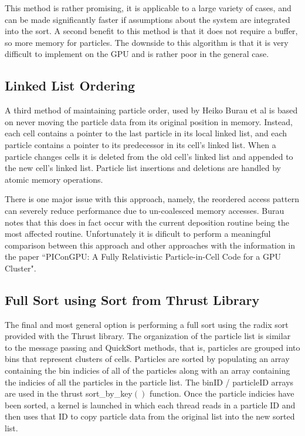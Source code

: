 This method is rather promising, it is applicable to a large variety of cases, and can be made significantly faster if assumptions about the system are integrated into the sort. A second benefit to this method is that it does not require a buffer, so more memory for particles. The downside to this algorithm is that it is very difficult to implement on the GPU and is rather poor in the general case. 


	\subsection{Linked List Ordering}
	A third method of maintaining particle order, used by Heiko Burau et al is based on never moving the particle data from its original position in memory. Instead, each cell contains a pointer to the last particle in its local linked list, and each particle contains a pointer to its predecessor in its cell's linked list. When a particle changes cells it is deleted from the old cell's linked list and appended to the new cell's linked list. Particle list insertions and deletions are handled by atomic memory operations. \cite{Burau2010}

	There is one major issue with this approach, namely, the reordered access pattern can severely reduce performance due to un-coalesced memory accesses. Burau notes that this does in fact occur with the current deposition routine being the most affected routine. Unfortunately it is dificult to perform a meaningful comparison between this approach and other approaches with the information in the paper ``PIConGPU: A Fully Relativistic Particle-in-Cell Code for a GPU Cluster". \cite{Burau2010}

	\subsection{Full Sort using Sort from Thrust Library}
	The final and most general option is performing a full sort using the radix sort provided with the Thrust library.\cite{NVIDIACorporation2011a} The organization of the particle list is similar to the message passing and QuickSort methods, that is, particles are grouped into bins that represent clusters of cells. Particles are sorted by populating an array containing the bin indicies of all of the particles along with an array containing the indicies of all the particles in the particle list. The binID / particleID arrays are used in the thrust sort\_by\_key$()$ function. Once the particle indicies have been sorted, a kernel is launched in which each thread reads in a particle ID and then uses that ID to copy particle data from the original list into the new sorted list. 

